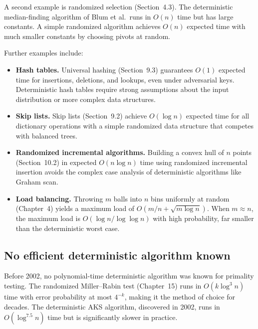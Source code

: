 \documentclass[twoside,12pt]{book}
\theoremstyle{plain}
\theoremstyle{definition}
\theoremstyle{remark}
\begin{document}
A second example is randomized selection (Section~4.3). The deterministic
median-finding algorithm of Blum et al.\ runs in $O(n)$ time but has large
constants. A simple randomized algorithm achieves $O(n)$ expected time
with much smaller constants by choosing pivots at random.

Further examples include:
\begin{itemize}
\item \textbf{Hash tables.} Universal hashing (Section~9.3) guarantees
$O(1)$ expected time for insertions, deletions, and lookups, even under
adversarial keys. Deterministic hash tables require strong assumptions
about the input distribution or more complex data structures.
\item \textbf{Skip lists.} Skip lists (Section~9.2) achieve $O(\log n)$
expected time for all dictionary operations with a simple randomized
data structure that competes with balanced trees.
\item \textbf{Randomized incremental algorithms.} Building a convex hull
of $n$ points (Section~10.2) in expected $O(n \log n)$ time using
randomized incremental insertion avoids the complex case analysis of
deterministic algorithms like Graham scan.
\item \textbf{Load balancing.} Throwing $m$ balls into $n$ bins uniformly
at random (Chapter~4) yields a maximum load of $O(m/n + \sqrt{m \log n})$.
When $m \approx n$, the maximum load is $O(\log n / \log \log n)$ with
high probability, far smaller than the deterministic worst case.
\end{itemize}

\subsection{No efficient deterministic algorithm known}

Before 2002, no polynomial-time deterministic algorithm was known for
primality testing. The randomized Miller--Rabin test (Chapter~15) runs in
$O(k \log^3 n)$ time with error probability at most $4^{-k}$, making it the
method of choice for decades. The deterministic AKS algorithm, discovered
in 2002, runs in $O(\log^{7.5} n)$ time but is significantly slower in
practice.
\end{document}
